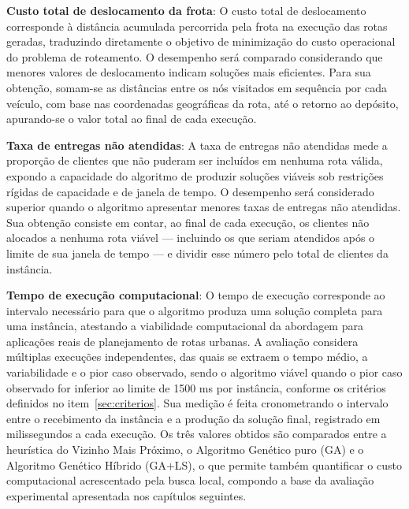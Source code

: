\begin{alineas}
	\item \textbf{Custo total de deslocamento da frota}: O custo total de deslocamento
	corresponde à distância acumulada percorrida pela frota na execução das rotas
	geradas, traduzindo diretamente o objetivo de minimização do custo operacional do
	problema de roteamento. O desempenho será comparado considerando que menores
	valores de deslocamento indicam soluções mais eficientes. Para sua obtenção,
	somam-se as distâncias entre os nós visitados em sequência por cada veículo, com
	base nas coordenadas geográficas da rota, até o retorno ao depósito, apurando-se o
	valor total ao final de cada execução.

	\item \textbf{Taxa de entregas não atendidas}: A taxa de entregas não atendidas mede
	a proporção de clientes que não puderam ser incluídos em nenhuma rota válida,
	expondo a capacidade do algoritmo de produzir soluções viáveis sob restrições
	rígidas de capacidade e de janela de tempo. O desempenho será considerado superior
	quando o algoritmo apresentar menores taxas de entregas não atendidas. Sua obtenção
	consiste em contar, ao final de cada execução, os clientes não alocados a nenhuma
	rota viável --- incluindo os que seriam atendidos após o limite de sua janela de
	tempo --- e dividir esse número pelo total de clientes da instância.

	\item \textbf{Tempo de execução computacional}: O tempo de execução corresponde ao
	intervalo necessário para que o algoritmo produza uma solução completa para uma
	instância, atestando a viabilidade computacional da abordagem para aplicações reais
	de planejamento de rotas urbanas. A avaliação considera múltiplas execuções
	independentes, das quais se extraem o tempo médio, a variabilidade e o pior caso
	observado, sendo o algoritmo viável quando o pior caso observado for inferior ao
	limite de 1500 ms por instância, conforme os critérios definidos no
	item~\ref{sec:criterios}. Sua medição é feita cronometrando o intervalo entre o
	recebimento da instância e a produção da solução final, registrado em
	milissegundos a cada execução. Os três valores obtidos são comparados entre a
	heurística do Vizinho Mais Próximo, o Algoritmo Genético puro (GA) e o Algoritmo
	Genético Híbrido (GA+LS), o que permite também quantificar o custo computacional
	acrescentado pela busca local, compondo a base da avaliação experimental
	apresentada nos capítulos seguintes.


\end{alineas}
